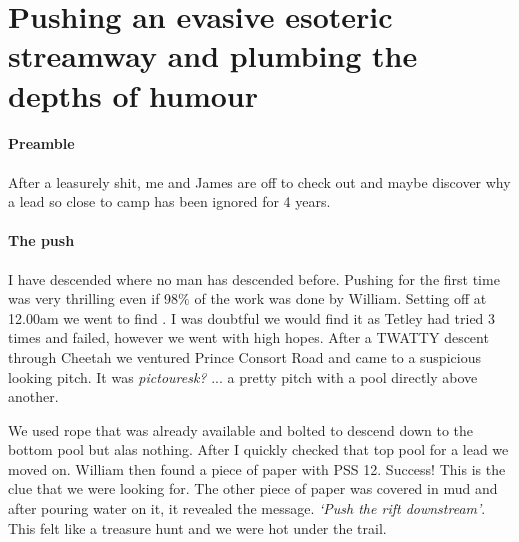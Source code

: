 \begin{marginfigure}
\end{marginfigure}

\section{Pushing an evasive esoteric streamway and plumbing the depths of humour}

\paragraph{Preamble}
After a leasurely shit, me and James are off to check out  and maybe discover why a lead so close to camp has been ignored for 4 years.
\paragraph{The push} I have descended where no man has descended before. Pushing for the first time was very thrilling even if 98$\%$ of the work was done by William. 
Setting off at 12.00am we went to find . I was doubtful we would find it as Tetley had tried 3 times and failed, however we went with high hopes.
After a TWATTY descent through Cheetah we ventured Prince Consort Road and came to a suspicious looking pitch. It was \textit{pictouresk?} ...  a pretty pitch with a pool directly above another.

We used rope that was already available and bolted to descend down to the bottom pool but alas nothing. After I quickly checked that top pool for a lead we moved on. William then found a piece of paper with PSS 12. Success! This is the clue that we were looking for. The other piece of paper was covered in mud and after pouring water on it, it revealed the message.  \textit{‘Push the rift downstream’}. This felt like a treasure hunt and we were hot under the trail.


